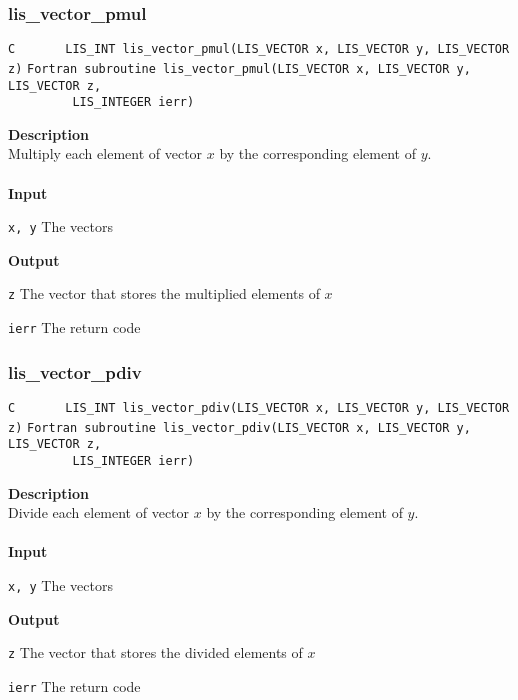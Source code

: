 \documentclass[a4paper]{article}
\newcommand{\namelistlabel}[1]{\mbox{#1}\hfill}
\newenvironment{namelist}[1]{%
\begin{list}{}
  {\let\makelabel\namelistlabel
  \settowidth{\labelwidth}{#1}
  \setlength{\leftmargin}{1.1\labelwidth}}
  }{%
\end{list}}
\begin{document}
\newpage
\subsubsection{lis\_vector\_pmul}
\begin{screen}
\verb|C       LIS_INT lis_vector_pmul(LIS_VECTOR x, LIS_VECTOR y, LIS_VECTOR z)|
\verb|Fortran subroutine lis_vector_pmul(LIS_VECTOR x, LIS_VECTOR y, LIS_VECTOR z,|\\
\verb|         LIS_INTEGER ierr)|
\end{screen}
{\bf Description}\\
\indent
Multiply each element of vector $x$ by the corresponding element of $y$.
\\ \\
\noindent
{\bf Input}
\begin{namelist}{XXXXXXXXXXXXXXXXXXXX}
\item[\tt x, y] The vectors
\end{namelist}
{\bf Output}
\begin{namelist}{XXXXXXXXXXXXXXXXXXXX}
\item[\tt z] The vector that stores the multiplied elements of $x$
\item[\tt ierr] The return code
\end{namelist}

\subsubsection{lis\_vector\_pdiv}
\begin{screen}
\verb|C       LIS_INT lis_vector_pdiv(LIS_VECTOR x, LIS_VECTOR y, LIS_VECTOR z)|
\verb|Fortran subroutine lis_vector_pdiv(LIS_VECTOR x, LIS_VECTOR y, LIS_VECTOR z,|\\
\verb|         LIS_INTEGER ierr)|
\end{screen}
{\bf Description}\\
\indent
Divide each element of vector $x$ by the corresponding element of $y$.
\\ \\
\noindent
{\bf Input}
\begin{namelist}{XXXXXXXXXXXXXXXXXXXX}
\item[\tt x, y] The vectors
\end{namelist}
{\bf Output}
\begin{namelist}{XXXXXXXXXXXXXXXXXXXX}
\item[\tt z] The vector that stores the divided elements of $x$
\item[\tt ierr] The return code
\end{namelist}
\end{document}
